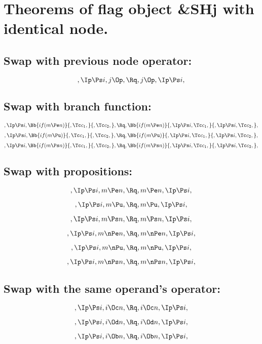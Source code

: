 \bigskip
\bigskip
\bigskip
\bigskip
\section{Theorems of flag object \&SHj with identical node.}
\subsection{Swap with previous node operator:}
\[,\Ip \Ps i, j \Op, \Rq ,j \Op, \Ip \Ps i,\]

\bigskip
\bigskip
\subsection{Swap with branch function:}
\[,\Ip \Ps i, \Bb{if(m \Pe n)}{,\Tc c_1,}{,\Tc c_2,}, \Rq , \Bb{if(m \Pe n)}{,\Ip \Ps i, \Tc c_1,}{,\Ip \Ps i, \Tc c_2,},\]
\bigskip
\bigskip
\[,\Ip \Ps i, \Bb{if(m \Pu)}{,\Tc c_1,}{,\Tc c_2,}, \Rq , \Bb{if(m \Pu)}{,\Ip \Ps i, \Tc c_1,}{,\Ip \Ps i, \Tc c_2,},\]
\bigskip
\bigskip
\[,\Ip \Ps i, \Bb{if(m \Ps n)}{,\Tc c_1,}{,\Tc c_2,}, \Rq , \Bb{if(m \Ps n)}{,\Ip \Ps i, \Tc c_1,}{,\Ip \Ps i, \Tc c_2,},\]


\bigskip
\bigskip
\subsection{Swap with propositions:}
\[,\Ip \Ps i, m \Pe n, \Rq , m \Pe n, \Ip \Ps i,\]

\[,\Ip \Ps i, m \Pu, \Rq , m \Pu, \Ip \Ps i,\]

\[,\Ip \Ps i, m \Ps n, \Rq , m \Ps n, \Ip \Ps i,\]

\[,\Ip \Ps i, m \nPe n, \Rq , m \nPe n, \Ip \Ps i,\]

\[,\Ip \Ps i, m \nPu, \Rq , m \nPu, \Ip \Ps i,\]

\[,\Ip \Ps i, m \nPs n, \Rq , m \nPs n, \Ip \Ps i,\]


\bigskip
\bigskip
\subsection{Swap with the same operand's operator:}
\[,\Ip \Ps i, i \Oc n, \Rq , i \Oc n, \Ip \Ps i,\]

\[,\Ip \Ps i, i \Od n, \Rq , i \Od n, \Ip \Ps i,\]

\[,\Ip \Ps i, i \Ob n, \Rq , i \Ob n, \Ip \Ps i,\]


\bigskip
\bigskip
